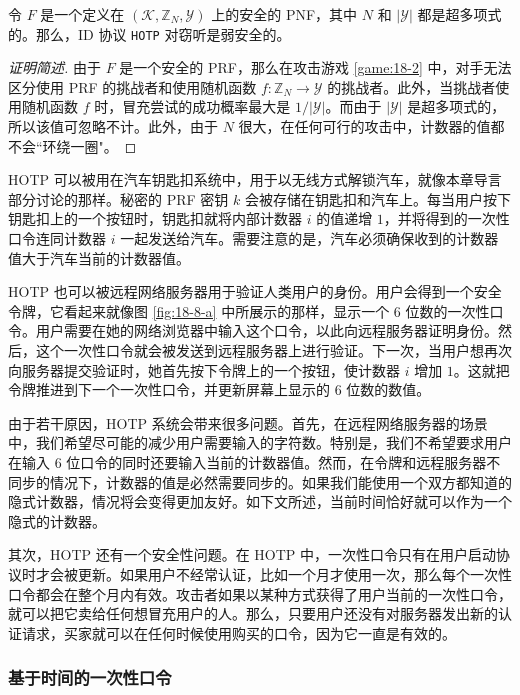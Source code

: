 \begin{theorem}\label{theo:18-4}
令 $F$ 是一个定义在 $(\mathcal{K},\mathbb{Z}_N,\mathcal{Y})$ 上的安全的 PNF，其中 $N$ 和 $|\mathcal{Y}|$ 都是超多项式的。那么，ID 协议 \texttt{HOTP} 对窃听是弱安全的。
\end{theorem}

\begin{proof}[证明简述]
由于 $F$ 是一个安全的 PRF，那么在攻击游戏 \ref{game:18-2} 中，对手无法区分使用 PRF 的挑战者和使用随机函数 $f:\mathbb{Z}_N\to\mathcal{Y}$ 的挑战者。此外，当挑战者使用随机函数 $f$ 时，冒充尝试的成功概率最大是 ${1}/{|\mathcal{Y}|}$。而由于 $|\mathcal{Y}|$ 是超多项式的，所以该值可忽略不计。此外，由于 $N$ 很大，在任何可行的攻击中，计数器的值都不会``环绕一圈"。
\end{proof}

HOTP 可以被用在汽车钥匙扣系统中，用于以无线方式解锁汽车，就像本章导言部分讨论的那样。秘密的 PRF 密钥 $k$ 会被存储在钥匙扣和汽车上。每当用户按下钥匙扣上的一个按钮时，钥匙扣就将内部计数器 $i$ 的值递增 $1$，并将得到的一次性口令连同计数器 $i$ 一起发送给汽车。需要注意的是，汽车必须确保收到的计数器值大于汽车当前的计数器值。

HOTP 也可以被远程网络服务器用于验证人类用户的身份。用户会得到一个安全令牌，它看起来就像图 \ref{fig:18-8-a} 中所展示的那样，显示一个 $6$ 位数的一次性口令。用户需要在她的网络浏览器中输入这个口令，以此向远程服务器证明身份。然后，这个一次性口令就会被发送到远程服务器上进行验证。下一次，当用户想再次向服务器提交验证时，她首先按下令牌上的一个按钮，使计数器 $i$ 增加 $1$。这就把令牌推进到下一个一次性口令，并更新屏幕上显示的 $6$ 位数的数值。

由于若干原因，HOTP 系统会带来很多问题。首先，在远程网络服务器的场景中，我们希望尽可能的减少用户需要输入的字符数。特别是，我们不希望要求用户在输入 $6$ 位口令的同时还要输入当前的计数器值。然而，在令牌和远程服务器不同步的情况下，计数器的值是必然需要同步的。如果我们能使用一个双方都知道的隐式计数器，情况将会变得更加友好。如下文所述，当前时间恰好就可以作为一个隐式的计数器。

其次，HOTP 还有一个安全性问题。在 HOTP 中，一次性口令只有在用户启动协议时才会被更新。如果用户不经常认证，比如一个月才使用一次，那么每个一次性口令都会在整个月内有效。攻击者如果以某种方式获得了用户当前的一次性口令，就可以把它卖给任何想冒充用户的人。那么，只要用户还没有对服务器发出新的认证请求，买家就可以在任何时候使用购买的口令，因为它一直是有效的。

\subsubsection{基于时间的一次性口令}\label{subsubsec:18-5-1-1}

